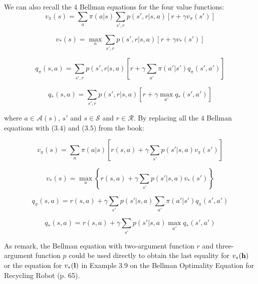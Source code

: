 \documentclass[10pt,a4paper]{article}
\begin{document}
We can also recall the $4$ Bellman equations for the four value functions:
\begin{equation}
v_\pi(s) = \sum_{a} \pi(a \lvert s) \sum_{s', r} p(s', r \lvert s, a) \left[r + \gamma v_\pi(s')\right]
\end{equation}

\begin{equation}
v_*(s) = \max_{a} \sum_{s', r} p(s', r \lvert s, a) \left[r + \gamma v_*(s')\right]
\end{equation}

\begin{equation}
q_\pi(s, a) = \sum_{s', r} p(s', r \lvert s, a) \left[r + \gamma \sum_{a'} \pi(a' \lvert s') q_\pi(s', a')\right]
\end{equation}

\begin{equation}
q_*(s, a) = \sum_{s', r} p(s', r \lvert s, a) \left[r + \gamma \max_{a'} q_*(s', a')\right]
\end{equation}


where $a \in \mathcal{A}(s)$, $s'$ and $s \in \mathcal{S}$ and $r \in \mathcal{R}$. By replacing all the $4$ Bellman equations with ($3.4$) and ($3.5$) from the book:

\begin{equation}
v_\pi(s) = \sum_{a} \pi(a \lvert s) \left[ r(s, a) + \gamma \sum_{s'} p(s' \lvert s, a) v_\pi(s')\right]
\end{equation}

\begin{equation}
v_*(s) = \max_{a} \left\{ r(s, a) + \gamma \sum_{s'} p(s' \lvert s, a) v_*(s') \right\}
\end{equation}


\begin{equation}
q_\pi(s, a) = r(s, a) + \gamma \sum_{s'} p(s' \lvert s, a) \sum_{a'} \pi(a' \lvert s') q_\pi(s', a')
\end{equation}

\begin{equation}
q_*(s, a) = r(s, a) + \gamma \sum_{s'} p(s' \lvert s, a) \max_{a'} q_*(s', a')
\end{equation}

As remark, the Bellman equation with two-argument function $r$ and three-argument  function $p$ could be used directly to obtain the last equality for $v_*(\textrm{\textbf{h}})$ or the equation for $v_*(\textrm{\textbf{l}})$ in Example $3.9$ on the Bellman Optimality Equation for Recycling Robot (p. 65).
\end{document}

